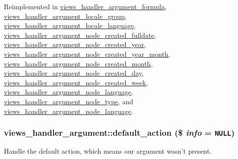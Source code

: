 Reimplemented in \hyperlink{classviews__handler__argument__formula_01284402427de2bcfa1b1da5792a2332}{views\_\-handler\_\-argument\_\-formula}, \hyperlink{classviews__handler__argument__locale__group_5dd96da33f67166727c6af6547ccbb7a}{views\_\-handler\_\-argument\_\-locale\_\-group}, \hyperlink{classviews__handler__argument__locale__language_de5af4ea7ada57c6716a6712bbc767c5}{views\_\-handler\_\-argument\_\-locale\_\-language}, \hyperlink{classviews__handler__argument__node__created__fulldate_f5b74c0204c9da9285cbe3e07ebed345}{views\_\-handler\_\-argument\_\-node\_\-created\_\-fulldate}, \hyperlink{classviews__handler__argument__node__created__year_a40b34ab0d297264f7378fc995e06bc7}{views\_\-handler\_\-argument\_\-node\_\-created\_\-year}, \hyperlink{classviews__handler__argument__node__created__year__month_9e090c0caf0a169fe3f9a78160896d01}{views\_\-handler\_\-argument\_\-node\_\-created\_\-year\_\-month}, \hyperlink{classviews__handler__argument__node__created__month_0f9b4da1f37a58ca3e416667dc8d9bbb}{views\_\-handler\_\-argument\_\-node\_\-created\_\-month}, \hyperlink{classviews__handler__argument__node__created__day_eb33813a3cc0da642e45a12625da5bde}{views\_\-handler\_\-argument\_\-node\_\-created\_\-day}, \hyperlink{classviews__handler__argument__node__created__week_e90c3f8a723cfa081198075d2fe67c52}{views\_\-handler\_\-argument\_\-node\_\-created\_\-week}, \hyperlink{classviews__handler__argument__node__language_96f52469109294ad151b3ca21c261795}{views\_\-handler\_\-argument\_\-node\_\-language}, \hyperlink{classviews__handler__argument__node__type_46ce861fa61b59bb22f001501c3b2650}{views\_\-handler\_\-argument\_\-node\_\-type}, and \hyperlink{classviews__handler__argument__node__language_96f52469109294ad151b3ca21c261795}{views\_\-handler\_\-argument\_\-node\_\-language}.\hypertarget{classviews__handler__argument_6c4d14fd0c639184162d7d684a2e04a6}{
\subsubsection[{default\_\-action}]{\setlength{\rightskip}{0pt plus 5cm}views\_\-handler\_\-argument::default\_\-action (\$ {\em info} = {\tt NULL})}}
\label{classviews__handler__argument_6c4d14fd0c639184162d7d684a2e04a6}


Handle the default action, which means our argument wasn't present.

